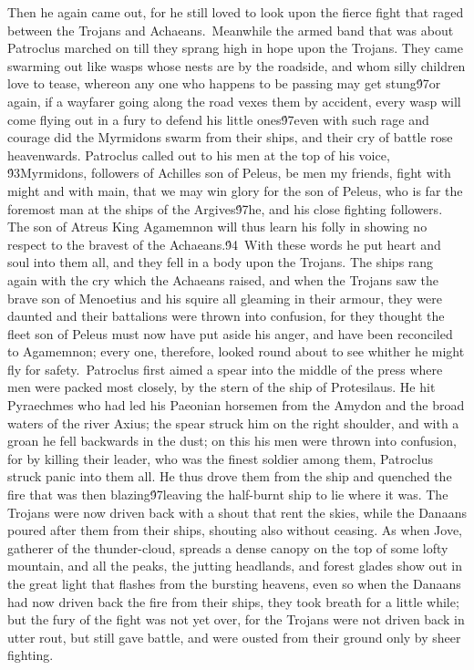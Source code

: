 {Then he again came out, for he still loved to look upon the fierce fight that raged between the Trojans and Achaeans.\
Meanwhile the armed band that was about Patroclus marched on till they sprang high in hope upon the Trojans. They came swarming out like wasps whose nests are by the roadside, and whom silly children love to tease, whereon any one who happens to be passing may get stung\'97or again, if a wayfarer going along the road vexes them by accident, every wasp will come flying out in a fury to defend his little ones\'97even with such rage and courage did the Myrmidons swarm from their ships, and their cry of battle rose heavenwards. Patroclus called out to his men at the top of his voice, \'93Myrmidons, followers of Achilles son of Peleus, be men my friends, fight with might and with main, that we may win glory for the son of Peleus, who is far the foremost man at the ships of the Argives\'97he, and his close fighting followers. The son of Atreus King Agamemnon will thus learn his folly in showing no respect to the bravest of the Achaeans.\'94\
With these words he put heart and soul into them all, and they fell in a body upon the Trojans. The ships rang again with the cry which the Achaeans raised, and when the Trojans saw the brave son of Menoetius and his squire all gleaming in their armour, they were daunted and their battalions were thrown into confusion, for they thought the fleet son of Peleus must now have put aside his anger, and have been reconciled to Agamemnon; every one, therefore, looked round about to see whither he might fly for safety.\
Patroclus first aimed a spear into the middle of the press where men were packed most closely, by the stern of the ship of Protesilaus. He hit Pyraechmes who had led his Paeonian horsemen from the Amydon and the broad waters of the river Axius; the spear struck him on the right shoulder, and with a groan he fell backwards in the dust; on this his men were thrown into confusion, for by killing their leader, who was the finest soldier among them, Patroclus struck panic into them all. He thus drove them from the ship and quenched the fire that was then blazing\'97leaving the half-burnt ship to lie where it was. The Trojans were now driven back with a shout that rent the skies, while the Danaans poured after them from their ships, shouting also without ceasing. As when Jove, gatherer of the thunder-cloud, spreads a dense canopy on the top of some lofty mountain, and all the peaks, the jutting headlands, and forest glades show out in the great light that flashes from the bursting heavens, even so when the Danaans had now driven back the fire from their ships, they took breath for a little while; but the fury of the fight was not yet over, for the Trojans were not driven back in utter rout, but still gave battle, and were ousted from their ground only by sheer fighting.\
}
